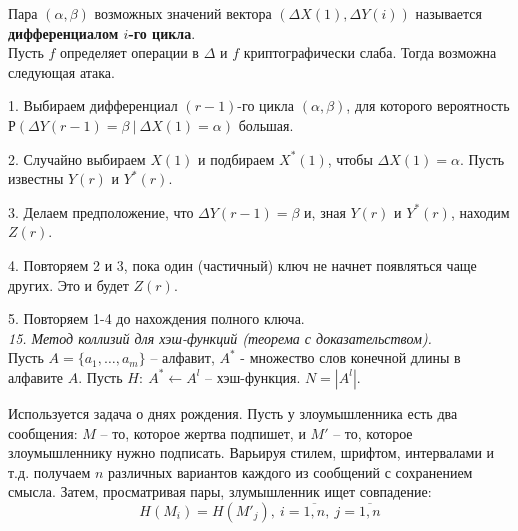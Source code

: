 Пара $(\alpha, \beta)$ возможных значений вектора $(\Delta X(1), \Delta Y(i))$ называется \textbf{дифференциалом $i$-го цикла}. \\

\noindent Пусть $f$ определяет операции в $\Delta$ и $f$ криптографически слаба. Тогда возможна следующая атака.

1. Выбираем дифференциал $(r-1)$-го цикла $(\alpha, \beta)$, для которого вероятность $Р(\Delta Y(r-1) = \beta\ |\ \Delta X(1) = \alpha)$ большая.

2. Случайно выбираем $X(1)$ и подбираем $X^* (1)$, чтобы
$\Delta X(1) = \alpha$. Пусть известны $Y(r)$ и $Y^* (r)$.

3. Делаем предположение, что $\Delta Y(r-1) = \beta$ и, зная $Y(r)$ и $Y^* (r)$, находим $Z(r)$.

4. Повторяем 2 и 3, пока один (частичный) ключ не начнет
появляться чаще других. Это и будет $Z(r)$.

5. Повторяем 1-4 до нахождения полного ключа. \\

\noindent \textit{15. Метод коллизий для хэш-функций (теорема с доказательством).} \\

Пусть $A = \{a_1, \ldots, a_m \}$ -- алфавит, $A^*$ - множество слов конечной длины в алфавите $A$. Пусть $H:\ A^* \leftarrow A^l$ -- хэш-функция. $N = |A^l|$.

Используется задача о днях рождения. Пусть у злоумышленника есть два сообщения: $M$ -- то, которое жертва подпишет, и $M'$ -- то, которое злоумышленнику нужно подписать. Варьируя стилем, шрифтом, интервалами и т.д. получаем $n$ различных вариантов каждого из сообщений с сохранением смысла. Затем, просматривая пары, злумышленник ищет совпадение:
$$H(M_i) = H(M'_j),\ i = \overline{1, n},\ j = \overline{1, n}$$

